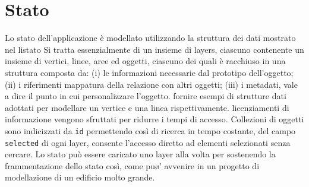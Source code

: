 \newpage
\section{Stato}
\label{sec:chapter_2_section_2}

Lo stato dell'applicazione è modellato utilizzando la struttura dei dati mostrato nel listato %
Si tratta essenzialmente di un insieme di layers, ciascuno contenente un insieme di vertici, linee, aree
ed oggetti, ciascuno dei quali è racchiuso in una struttura composta da: (i) le informazioni necessarie
dal prototipo dell'oggetto; (ii) i riferimenti mappatura della relazione con altri oggetti; (iii) i metadati,
vale a dire il punto in cui personalizzare l'oggetto. %
fornire esempi di strutture dati adottati per modellare un vertice e una linea rispettivamente.
licenziamenti di informazione vengono sfruttati per ridurre i tempi di accesso. Collezioni di oggetti
sono indicizzati da \texttt{id} permettendo così di ricerca in tempo costante, del
campo \texttt{selected} di ogni layer, consente l'accesso diretto ad elementi selezionati senza cercare.
Lo stato può essere caricato uno layer alla volta per sostenendo la frammentazione dello stato così,
come pu\o' avvenire in un progetto di modellazione di un edificio molto grande.


